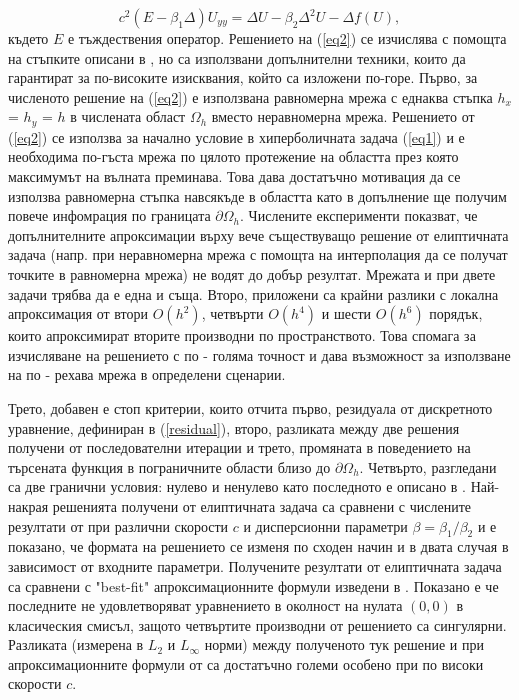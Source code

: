 \documentclass{article}
\newcommand{\rf}[1]{(\ref{#1})}
\begin{document}
\begin{equation}\label{eq2}
c^2 (E-\beta_1 \Delta) U_{yy} = \Delta U -\beta_2 \Delta^2 U - \Delta f(U),
\end{equation}
където $E$ е тъждествения оператор. Решението на \rf{eq2} се изчислява с помощта на стъпките описани в \cite{Ch2012,chd-chr}, но са използвани допълнителни техники, които да гарантират за по-високите изисквания, който са изложени по-горе.
Първо, за численото решение на \rf{eq2} е използвана равномерна мрежа с еднаква стъпка $h_x$ = $h_y$ = $h$ в числената област $\Omega_h$ вместо неравномерна мрежа. Решението от \rf{eq2} се използва за начално условие в хиперболичната задача \rf{eq1} и е необходима по-гъста мрежа по цялото протежение на областта през която максимумът на вълната преминава. Това дава достатъчно мотивация да се използва равномерна стъпка навсякъде в областта като в допълнение ще получим повече инфомрация по границата $\partial \Omega_h$. Числените експерименти показват, че допълнителните апроксимации върху вече съществуващо решение от елиптичната задача (напр. при неравномерна мрежа с помощта на интерполация да се получат точките в равномерна мрежа) не водят до добър резултат. Мрежата и при двете задачи трябва да е една и съща.
Второ, приложени са крайни разлики с локална апроксимация от втори $O(h^2)$, четвърти $O(h^4)$ и шести $O(h^6)$ порядък, които апроксимират вторите производни по пространството. Това спомага за изчисляване на решението с по - голяма точност и дава възможност за използване на по - рехава мрежа в определени сценарии.

Трето, добавен е стоп критерии, които отчита първо, резидуала от дискретното уравнение, дефиниран в \rf{residual}, второ, разликата между две решения получени от последователни итерации и трето, промяната в поведението на търсената функция в пограничните области близо до $\partial \Omega_h$.
Четвърто, разгледани са две гранични условия: нулево и ненулево като последното е описано в \cite{bnd}.
Най-накрая решенията получени от елиптичната задача са сравнени с числените резултати от \cite{Ch2012,Ch2011} при различни скорости $c$ и дисперсионни параметри $\beta =\beta_1  / \beta_2$ и е показано, че формата на решението се изменя по сходен начин и в двата случая в зависимост от входните параметри. Получените резултати от елиптичната задача са сравнени с "best-fit" апроксимационните формули изведени в \cite{Ch2011}. Показано е че последните не удовлетворяват уравнението в околност на нулата $(0,0)$ в класическия смисъл, защото четвъртите производни от решението са сингулярни. Разликата (измерена в $L_2$ и $L_\infty$ норми) между полученото тук решение и при апроксимационните формули от \cite{Ch2011} са достатъчно големи особено при по високи скорости $c$.
\end{document}
